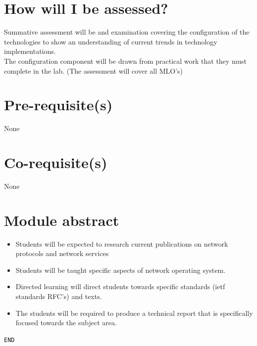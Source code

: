 \documentclass[11pt]{article}
\begin{document}
\section{How will I be assessed?}

\noindent Summative assessment will be and examination covering the configuration of the technologies to show an understanding of current trends in technology implementations.\\

\noindent The configuration component will be drawn from practical work that they must complete in the lab. (The assessment will cover all MLO's)\\

\section{Pre-requisite(s)}

None

\section{Co-requisite(s)}

None

\section{Module abstract}

\begin{itemize}
  \item Students will be expected to research current publications on network protocols and network services
  \item Students will be taught specific aspects of network operating system.
  \item Directed learning will direct students towards specific standards (ietf standards RFC's) and texts.
  \item The students will be required to produce a technical report that is specifically focused towards the subject area.
  \end{itemize}

\noindent \texttt{END}
\end{document}
